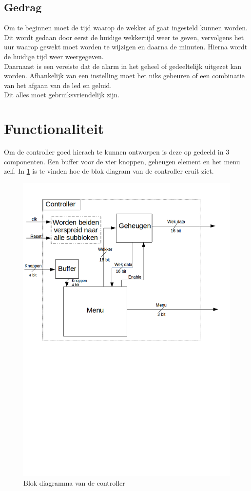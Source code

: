 \subsection{Gedrag}
Om te beginnen moet de tijd waarop de wekker af gaat ingesteld kunnen worden. Dit wordt gedaan door eerst de huidige wekkertijd weer te geven, vervolgens het uur waarop gewekt moet worden te wijzigen en daarna de minuten. Hierna wordt de huidige tijd weer weergegeven. \\
Daarnaast is een vereiste dat de alarm in het geheel of gedeeltelijk uitgezet kan worden. Afhankelijk van een instelling moet het niks gebeuren of een combinatie van het afgaan van de led en geluid.\\
Dit alles moet gebruiksvriendelijk zijn.

\section{Functionaliteit}

Om de controller goed hierach te kunnen ontworpen is deze op gedeeld in 3 componenten.
Een buffer voor de vier knoppen, geheugen element en het menu zelf. In \cref{fig:blk_controller} is te vinden hoe de blok diagram van de controller eruit ziet.

\begin{figure}
\includegraphics[width=\textwidth,height=\textheight,keepaspectratio]{Figuren/Controller/blok_controller.png}
\caption{Blok diagramma van de controller}
\label{fig:blk_controller}
\end{figure}

